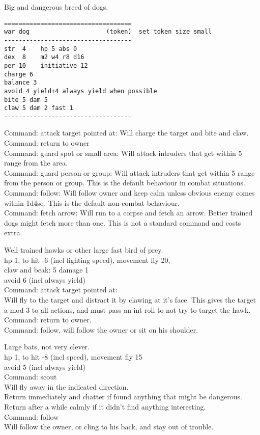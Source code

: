Big and dangerous breed of dogs.
\small \begin{samepage} \begin{verbatim}
===================================
war dog                     (token)  set token size small
-----------------------------------
str  4    hp 5 abs 0
dex  8    m2 w4 r8 d16
per 10    initiative 12
charge 6
balance 3
avoid 4 yield+4 always yield when possible
bite 5 dam 5
claw 5 dam 2 fast 1
-----------------------------------
\end{verbatim} \end{samepage} \normalsize
Command: attack target pointed at: Will charge the target and bite and claw. \\
Command: return to owner \\
Command: guard spot or small area: Will attack intruders that get within 5 range from the area. \\
Command: guard person or group: Will attack intruders that get within 5 range from the person or group. This is the default behaviour in combat situations. \\
Command: follow: Will follow owner and keep calm unless obvious enemy comes within 1d4sq. This is the default non-combat behaviour. \\
Command: fetch arrow: Will run to a corpse and fetch an arrow. Better trained dogs might fetch more than one. This is not a standard command and costs extra.


Well trained hawks or other large fast bird of prey. \\
hp 1, to hit -6 (incl fighting speed), movement fly 20, \\
claw and beak: 5 damage 1 \\
avoid  6 (incl always yield) \\
Command: attack target pointed at: \\
Will fly to the target and distract it by clawing at it's face. This gives the target a mod-3 to all actions, and must pass an int roll to not try to target the hawk. \\
Command: return to owner. \\
Command: follow, will follow the owner or sit on his shoulder.


Large bats, not very clever. \\
hp 1, to hit -8 (incl speed), movement fly 15 \\
avoid 5 (incl always yield) \\
Command: scout \\
Will fly away in the indicated direction. \\
Return immediately and chatter if found anything that might be dangerous. \\
Return after a while calmly if it didn't find anything interesting. \\
Command: follow \\
Will follow the owner, or cling to his back, and stay out of trouble.


